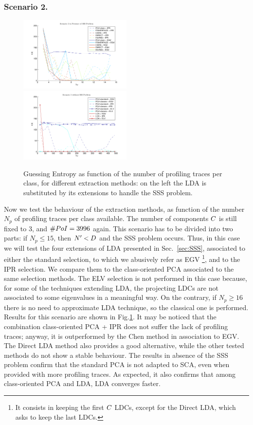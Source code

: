 \subsubsection{Scenario 2.}
\begin{figure}
\includegraphics[width=0.5\textwidth]{figures/Criterion2SSS.pdf}
\includegraphics[width=0.5\textwidth]{figures/Criterion2notSSS.pdf} 
\caption{Guessing Entropy as function of the number of profiling traces per class, for different extraction methods: on the left the LDA is substituted by its extensions to handle the SSS problem.}\label{fig:2}
\end{figure}
Now we test the behaviour of the extraction methods, as function of the number $N_p$ of profiling traces per class available. The number of components $\newTraceLength$ is still fixed to 3, and $\numPoI=3996$ again. This scenario has to be divided into two parts: if $N_p\leq 15$, then $\numTraces[]'<\traceLength$ and the SSS problem occurs. Thus, in this case we will test the four extensions of LDA presented in Sec.~\ref{sec:SSS}, associated to either the standard selection, to which we abusively refer as EGV \footnote{It consists in keeping the first $\newTraceLength$ LDCs, except for the Direct LDA, which asks to keep the last LDCs.}, and to the IPR selection.  We compare them to the class-oriented PCA associated to the same selection methods. The ELV selection is not performed in this case because, for some of the techniques extending LDA, the projecting LDCs are not associated to some eigenvalues in a meaningful way. On the contrary, if $N_p\geq 16$ there is no need to approximate LDA technique, so the classical one is performed. Results for this scenario are shown in Fig.\ref{fig:2}. It may be noticed that the combination class-oriented PCA + IPR does not suffer the lack of profiling traces; anyway, it is outperformed by the Chen method in association to EGV. The Direct LDA method also provides a good alternative, while the other tested methods do not show a stable behaviour. The results in absence of the SSS problem confirm that the standard PCA is not adapted to SCA, even when provided with more profiling traces. As expected, it also confirms that among class-oriented PCA and LDA, LDA converges faster.



